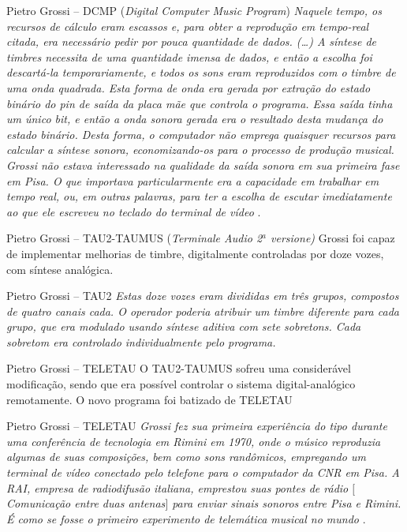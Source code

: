 \documentclass[aspectratio=169]{beamer}
\begin{document}
\begin{frame}{Pietro Grossi -- DCMP (\emph{Digital Computer Music Program})}
\emph{Naquele tempo, os recursos de cálculo eram escassos e, para obter a reprodução em tempo-real citada, era necessário pedir por pouca quantidade de dados. (\ldots) A síntese de timbres necessita de uma quantidade imensa de dados, e então a escolha foi descartá-la temporariamente, e todos os sons eram reproduzidos com o timbre de uma onda quadrada. Esta forma de onda era gerada por extração do estado binário do \emph{pin} de saída da placa mãe que controla o programa. Essa saída tinha um único \emph{bit}, e então a onda sonora gerada era o resultado desta mudança do estado binário. Desta forma, o computador não emprega quaisquer recursos para calcular a síntese sonora, economizando-os para o processo de produção musical. Grossi não estava interessado na qualidade da saída sonora em sua primeira fase em Pisa. O que importava particularmente era a capacidade em trabalhar em tempo real, ou, em outras palavras, para ter a escolha de escutar imediatamente ao que ele escreveu no teclado do terminal de vídeo} .
\end{frame}

\begin{frame}{Pietro Grossi -- TAU2-TAUMUS (\emph{Terminale Audio 2$^a$ versione)}}
Grossi foi capaz de implementar melhorias de timbre, digitalmente controladas por doze vozes, com síntese analógica.
\end{frame}

\begin{frame}{Pietro Grossi -- TAU2}
\emph{Estas doze vozes eram divididas em três grupos, compostos de quatro canais cada. O operador poderia atribuir um timbre diferente para cada grupo, que era modulado usando síntese aditiva com sete sobretons. Cada sobretom era controlado individualmente pelo programa.}
\end{frame}

\begin{frame}{Pietro Grossi -- TELETAU}
O TAU2-TAUMUS sofreu uma considerável modificação, sendo que era possível controlar o sistema digital-analógico remotamente. O novo programa foi batizado de TELETAU 
\end{frame}

\begin{frame}{Pietro Grossi -- TELETAU}
\emph{Grossi fez sua primeira experiência do tipo durante uma conferência de tecnologia em Rimini em 1970, onde o músico reproduzia algumas de suas composições, bem como sons randômicos, empregando um terminal de vídeo conectado pelo telefone para o computador da CNR em Pisa. A RAI, empresa de radiodifusão italiana, emprestou suas pontes de rádio $[$Comunicação entre duas antenas$]$ para enviar sinais sonoros entre Pisa e Rimini. É como se fosse o primeiro experimento de telemática musical no mundo} \cite[p.~129]{mori_pietro_2015}.
\end{frame}
\end{document}
